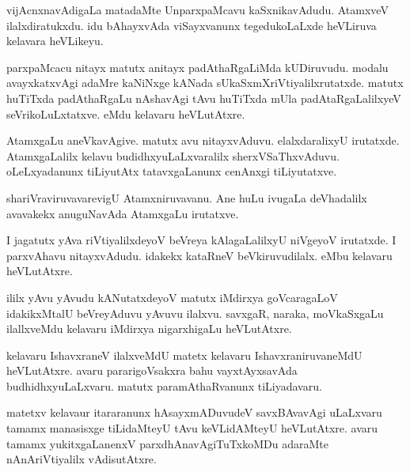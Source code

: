 \documentclass{article}
\begin{document}
\begin{mn}%
vijAcnxnavAdigaLa matadaMte UnparxpaMcavu kaSxnikavAdudu. AtamxveV ilalxdiratukxdu. idu bAhayxvAda 
viSayxvanunx tegedukoLaLxde heVLiruva kelavara heVLikeyu.
\end{mn}

\begin{mn}%
parxpaMcacu nitayx matutx anitayx padAthaRgaLiMda kUDiruvudu. modalu avayxkatxvAgi adaMre kaNiNxge 
kANada sUkaSxmXriVtiyalilxrutatxde. matutx huTiTxda padAthaRgaLu nAshavAgi tAvu huTiTxda mUla 
padAtaRgaLalilxyeV seVrikoLuLxtatxve. eMdu kelavaru heVLutAtxre.
\end{mn}

\begin{mn}%
AtamxgaLu aneVkavAgive. matutx avu nitayxvAduvu. elalxdaralixyU irutatxde. AtamxgaLalilx kelavu 
budidhxyuLaLxvaralilx sherxVSaThxvAduvu. oLeLxyadanunx tiLiyutAtx tatavxgaLanunx cenAnxgi 
tiLiyutatxve.
\end{mn}

\begin{mn}%
shariVraviruvavarevigU Atamxniruvavanu. Ane huLu ivugaLa deVhadalilx avavakekx anuguNavAda 
AtamxgaLu irutatxve.
\end{mn}

\begin{mn}%
I jagatutx yAva riVtiyalilxdeyoV beVreya kAlagaLalilxyU niVgeyoV irutatxde. I parxvAhavu 
nitayxvAdudu. idakekx kataRneV beVkiruvudilalx. eMbu kelavaru heVLutAtxre.
\end{mn}

\begin{mn}%
ililx yAvu yAvudu kANutatxdeyoV matutx iMdirxya goVcaragaLoV idakikxMtalU beVreyAduvu yAvuvu 
ilalxvu. savxgaR, naraka, moVkaSxgaLu ilallxveMdu kelavaru iMdirxya nigarxhigaLu heVLutAtxre.
\end{mn}

\begin{mn}%
kelavaru IshavxraneV ilalxveMdU matetx kelavaru IshavxraniruvaneMdU heVLutAtxre. avaru 
pararigoVsakxra bahu vayxtAyxsavAda budhidhxyuLaLxvaru. matutx paramAthaRvanunx tiLiyadavaru.
\end{mn}

\begin{mn}%
matetxv kelavaur itararanunx hAsayxmADuvudeV savxBAvavAgi uLaLxvaru tamamx manasisxge tiLidaMteyU 
tAvu keVLidAMteyU heVLutAtxre. avaru tamamx yukitxgaLanenxV parxdhAnavAgiTuTxkoMDu adaraMte 
nAnAriVtiyalilx vAdisutAtxre.
\end{mn}
\end{document}
